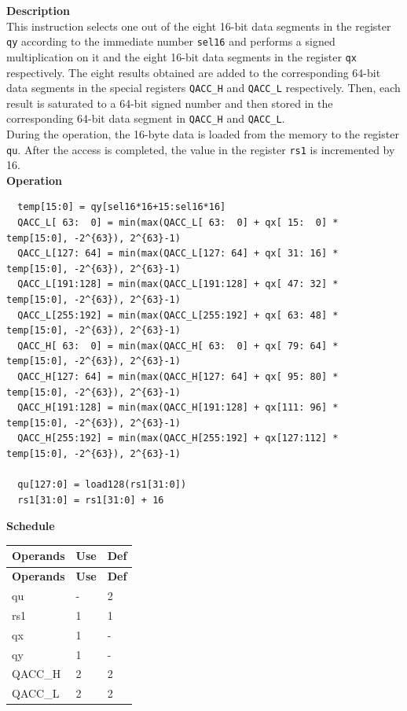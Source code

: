 \textbf{Description}\\
This instruction selects one out of the eight 16-bit data segments in the register \lstinline{qy} according to the immediate number \lstinline{sel16} and performs a signed multiplication on it and the eight 16-bit data segments in the register \lstinline{qx} respectively. The eight results obtained are added to the corresponding 64-bit data segments in the special registers \lstinline{QACC_H} and \lstinline{QACC_L} respectively. Then, each result is saturated to a 64-bit signed number and then stored in the corresponding 64-bit data segment in \lstinline{QACC_H} and \lstinline{QACC_L}.\\
During the operation, the 16-byte data is loaded from the memory to the register \lstinline{qu}. After the access is completed, the value in the register \lstinline{rs1} is incremented by 16.\\
\textbf{Operation}
\begin{lstlisting}
  temp[15:0] = qy[sel16*16+15:sel16*16]
  QACC_L[ 63:  0] = min(max(QACC_L[ 63:  0] + qx[ 15:  0] * temp[15:0], -2^{63}), 2^{63}-1)
  QACC_L[127: 64] = min(max(QACC_L[127: 64] + qx[ 31: 16] * temp[15:0], -2^{63}), 2^{63}-1)
  QACC_L[191:128] = min(max(QACC_L[191:128] + qx[ 47: 32] * temp[15:0], -2^{63}), 2^{63}-1)
  QACC_L[255:192] = min(max(QACC_L[255:192] + qx[ 63: 48] * temp[15:0], -2^{63}), 2^{63}-1)
  QACC_H[ 63:  0] = min(max(QACC_H[ 63:  0] + qx[ 79: 64] * temp[15:0], -2^{63}), 2^{63}-1)
  QACC_H[127: 64] = min(max(QACC_H[127: 64] + qx[ 95: 80] * temp[15:0], -2^{63}), 2^{63}-1)
  QACC_H[191:128] = min(max(QACC_H[191:128] + qx[111: 96] * temp[15:0], -2^{63}), 2^{63}-1)
  QACC_H[255:192] = min(max(QACC_H[255:192] + qx[127:112] * temp[15:0], -2^{63}), 2^{63}-1)

  qu[127:0] = load128(rs1[31:0])
  rs1[31:0] = rs1[31:0] + 16
\end{lstlisting}

\textbf{Schedule}\\
\begin{longtable}[c]{|l|l|l|}
    \hline
    \rowcolor{lightgray}
    \textbf{Operands} & \textbf{Use} & \textbf{Def} \\\hline
    \endfirsthead
    \hline
    \rowcolor{lightgray}
     \textbf{Operands} & \textbf{Use} & \textbf{Def} \\\hline
    \endhead
    \hline
    \endfoot

    qu & - & 2 \\\hline
    rs1 & 1 & 1 \\\hline
     qx & 1 & - \\\hline
     qy & 1 & - \\\hline
     QACC\_H & 2 & 2 \\\hline
     QACC\_L & 2 & 2

\end{longtable}


